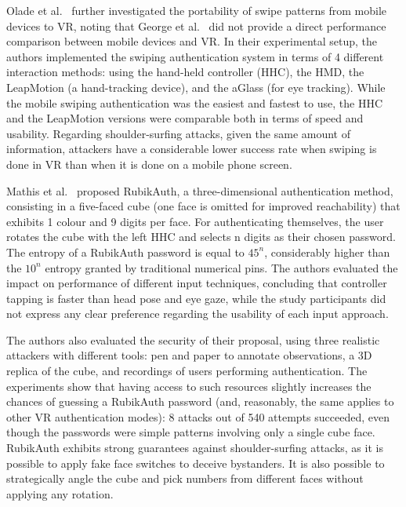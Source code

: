 \documentclass[journal]{IEEEtran}
\begin{document}
Olade et al.~\cite{olade2020swipe} further investigated the portability of swipe patterns from mobile devices to VR, noting that George et al.~\cite{george2017seamless} did not provide a direct performance comparison between mobile devices and VR. %
In their experimental setup, the authors implemented the swiping authentication system in terms of 4 different interaction methods: using the hand-held controller (HHC), the HMD, the LeapMotion (a hand-tracking device), and the aGlass (for eye tracking). While the mobile swiping authentication was the easiest and fastest to use, the HHC and the LeapMotion versions were comparable both in terms of speed and usability. Regarding shoulder-surfing attacks, given the same amount of information, attackers have a considerable lower success rate when swiping is done in VR than when it is done on a mobile phone screen.

Mathis et al.~\cite{mathis2020,mathis2021} proposed RubikAuth, a three-dimensional authentication method, consisting in a five-faced cube (one face is omitted for improved reachability) that exhibits 1 colour and 9 digits per face. For authenticating themselves, the user rotates the cube with the left HHC and selects n digits as their chosen password. The entropy of a RubikAuth password is equal to $45^n$, considerably higher than the $10^n$ entropy granted by traditional numerical pins. The authors evaluated the impact on performance of different input techniques, concluding that controller tapping is faster than head pose and eye gaze, while the study participants did not express any clear preference regarding the usability of each input approach. %

The authors also evaluated the security of their proposal, using three realistic attackers with different tools: pen and paper to annotate observations, a 3D replica of the cube, and recordings of users performing authentication. The experiments show that having access to such resources slightly increases the chances of guessing a RubikAuth password (and, reasonably, the same applies to other VR authentication modes): 8 attacks out of 540 attempts succeeded, even though the passwords were simple patterns involving only a single cube face. %
RubikAuth exhibits strong guarantees against shoulder-surfing attacks, as it is possible to apply fake face switches to deceive bystanders. It is also possible to strategically angle the cube and pick numbers from different faces without applying any rotation.
\end{document}
